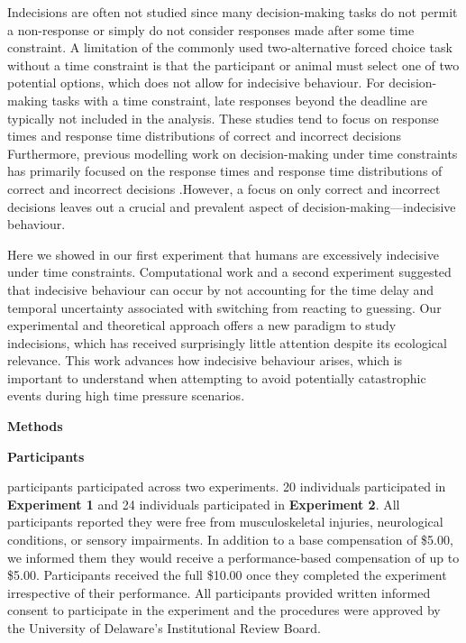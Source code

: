 \documentclass[12pt]{article}
\newcommand\boldblue[1]{\textcolor{mydarkblue}{\textbf{#1}}}
\newcommand{\SectionHeader}[1]{\noindent\boldblue{\Large{#1}}\normalsize }
\begin{document}
Indecisions are often not studied since many decision-making tasks do not permit a non-response or simply do not consider responses made after some time constraint. A limitation of the commonly used two-alternative forced choice task without a time constraint is that the participant or animal must select one of two potential options, which does not allow for indecisive behaviour. For decision-making tasks with a time constraint, late responses beyond the deadline are typically not included in the analysis\autocite*{forstmannStriatumPreSMAFacilitate2008,diederichFurtherTestSequentialsampling2008,wuCapacityCognitiveControl2016,dambacherTimePressureAffects2015}. These studies tend to focus on  response times and response time distributions of correct and incorrect decisions Furthermore, previous modelling work on decision-making under time constraints has primarily focused on the response times and response time distributions of correct and incorrect decisions \autocite*{karsilarSpeedAccuracyTradeoff2014,farashahiDynamicCombinationSensory2018}.However, a focus on only correct and incorrect decisions leaves out a crucial and prevalent aspect of decision-making—indecisive behaviour.

Here we showed in our first experiment that humans are excessively indecisive under time constraints. Computational work and a second experiment suggested that indecisive behaviour can occur by not accounting for the time delay and temporal uncertainty associated with switching from reacting to guessing. Our experimental and theoretical approach offers a new paradigm to study indecisions, which has received surprisingly little attention despite its ecological relevance. This work advances how indecisive behaviour arises, which is important to understand when attempting to avoid potentially catastrophic events during high time pressure scenarios.

\newpage
\SectionHeader{Methods}

\noindent\boldblue{Participants}

 participants participated across two experiments. 20 individuals participated in \boldblue{Experiment 1} and 24 individuals participated in \boldblue{Experiment 2}. All participants reported they were free from musculoskeletal injuries, neurological conditions, or sensory impairments. In addition to a base compensation of \$5.00, we informed them they would receive a performance-based compensation of up to \$5.00. Participants received the full \$10.00 once they completed the experiment irrespective of their performance. All participants provided written informed consent to participate in the experiment and the procedures were approved by the University of Delaware’s Institutional Review Board.
\end{document}
